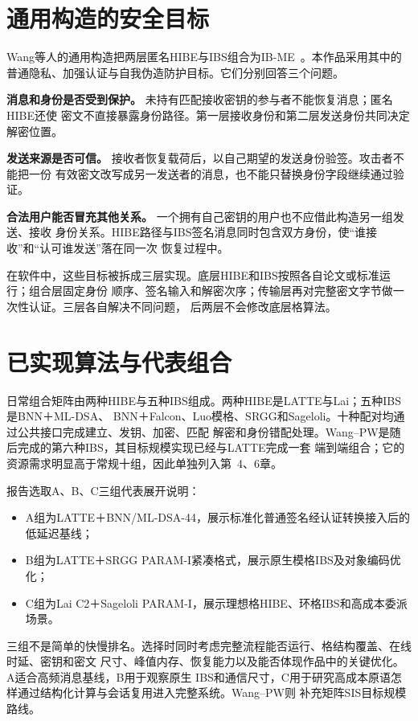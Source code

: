 \section{通用构造的安全目标}

Wang等人的通用构造把两层匿名HIBE与IBS组合为IB-ME~\cite{wang2024ibme}。本作品采用其中的
普通隐私、加强认证与自我伪造防护目标。它们分别回答三个问题。

\textbf{消息和身份是否受到保护。} 未持有匹配接收密钥的参与者不能恢复消息；匿名HIBE还使
密文不直接暴露身份路径。第一层接收身份和第二层发送身份共同决定解密位置。

\textbf{发送来源是否可信。} 接收者恢复载荷后，以自己期望的发送身份验签。攻击者不能把一份
有效密文改写成另一发送者的消息，也不能只替换身份字段继续通过验证。

\textbf{合法用户能否冒充其他关系。} 一个拥有自己密钥的用户也不应借此构造另一组发送、接收
身份关系。HIBE路径与IBS签名消息同时包含双方身份，使“谁接收”和“认可谁发送”落在同一次
恢复过程中。

在软件中，这些目标被拆成三层实现。底层HIBE和IBS按照各自论文或标准运行；组合层固定身份
顺序、签名输入和解密次序；传输层再对完整密文字节做一次性认证。三层各自解决不同问题，
后两层不会修改底层格算法。

\section{已实现算法与代表组合}

日常组合矩阵由两种HIBE与五种IBS组成。两种HIBE是LATTE与Lai；五种IBS是BNN＋ML-DSA、
BNN＋Falcon、Luo模格、SRGG和Sageloli。十种配对均通过公共接口完成建立、发钥、加密、匹配
解密和身份错配处理。Wang--PW是随后完成的第六种IBS，其目标规模实现已经与LATTE完成一套
端到端组合；它的资源需求明显高于常规十组，因此单独列入第~4、6章。

报告选取A、B、C三组代表展开说明：
\begin{itemize}
  \item A组为LATTE＋BNN/ML-DSA-44，展示标准化普通签名经认证转换接入后的低延迟基线；
  \item B组为LATTE＋SRGG PARAM-I紧凑格式，展示原生模格IBS及对象编码优化；
  \item C组为Lai C2＋Sageloli PARAM-I，展示理想格HIBE、环格IBS和高成本委派场景。
\end{itemize}

三组不是简单的快慢排名。选择时同时考虑完整流程能否运行、格结构覆盖、在线时延、密钥和密文
尺寸、峰值内存、恢复能力以及能否体现作品中的关键优化。A适合高频消息基线，B用于观察原生
IBS和通信尺寸，C用于研究高成本原语怎样通过结构化计算与会话复用进入完整系统。Wang--PW则
补充矩阵SIS目标规模路线。

